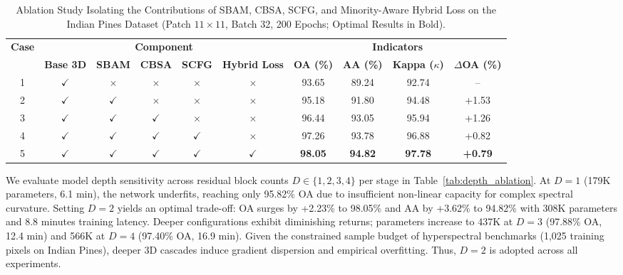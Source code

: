 \documentclass[manuscript,screen,review]{acmart}
\begin{document}
\begin{table}[t]
\centering
\scriptsize
\setlength{\tabcolsep}{3.5pt}
\caption{Ablation Study Isolating the Contributions of SBAM, CBSA, SCFG, and Minority-Aware Hybrid Loss on the Indian Pines Dataset (Patch $11 \times 11$, Batch 32, 200 Epochs; Optimal Results in Bold).}
\label{tab:component_ablation}
\begin{tabular}{c ccccc cccc}
\toprule
\multirow{2}{*}{\textbf{Case}} & \multicolumn{5}{c}{\textbf{Component}} & \multicolumn{4}{c}{\textbf{Indicators}} \\
\cmidrule(lr){2-6} \cmidrule(lr){7-10}
& \textbf{Base 3D} & \textbf{SBAM} & \textbf{CBSA} & \textbf{SCFG} & \textbf{Hybrid Loss} & \textbf{OA (\%)} & \textbf{AA (\%)} & \textbf{Kappa ($\kappa$)} & \textbf{$\Delta$OA (\%)} \\
\midrule
1 & $\checkmark$ & $\times$ & $\times$ & $\times$ & $\times$ & 93.65 & 89.24 & 92.74 & -- \\
2 & $\checkmark$ & $\checkmark$ & $\times$ & $\times$ & $\times$ & 95.18 & 91.80 & 94.48 & +1.53 \\
3 & $\checkmark$ & $\checkmark$ & $\checkmark$ & $\times$ & $\times$ & 96.44 & 93.05 & 95.94 & +1.26 \\
4 & $\checkmark$ & $\checkmark$ & $\checkmark$ & $\checkmark$ & $\times$ & 97.26 & 93.78 & 96.88 & +0.82 \\
5 & $\checkmark$ & $\checkmark$ & $\checkmark$ & $\checkmark$ & $\checkmark$ & \textbf{98.05} & \textbf{94.82} & \textbf{97.78} & \textbf{+0.79} \\
\bottomrule
\end{tabular}
\end{table}

We evaluate model depth sensitivity across residual block counts $D \in \{1, 2, 3, 4\}$ per stage in Table~\ref{tab:depth_ablation}. At $D=1$ (179K parameters, 6.1 min), the network underfits, reaching only 95.82\% OA due to insufficient non-linear capacity for complex spectral curvature. Setting $D=2$ yields an optimal trade-off: OA surges by +2.23\% to 98.05\% and AA by +3.62\% to 94.82\% with 308K parameters and 8.8 minutes training latency. Deeper configurations exhibit diminishing returns; parameters increase to 437K at $D=3$ (97.88\% OA, 12.4 min) and 566K at $D=4$ (97.40\% OA, 16.9 min). Given the constrained sample budget of hyperspectral benchmarks (1,025 training pixels on Indian Pines), deeper 3D cascades induce gradient dispersion and empirical overfitting. Thus, $D=2$ is adopted across all experiments.
\end{document}
